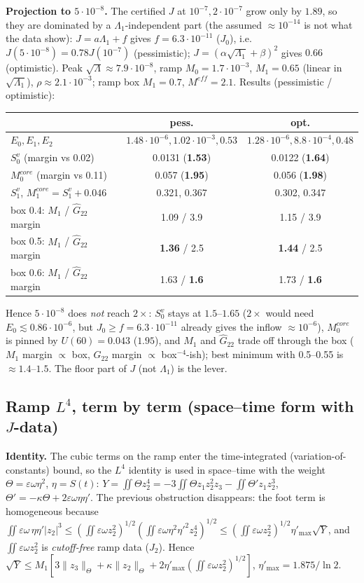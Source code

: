 \documentclass[11pt]{article}
\begin{document}
\textbf{Projection to $5\cdot10^{-8}$.} The certified $J$ at $10^{-7},2\cdot10^{-7}$ grow only by $1.89$, so they are dominated by a $\Lambda_1$-independent part (the assumed $\approx10^{-14}$ is not what the data show): $J=a\Lambda_1+f$ gives $f=6.3\cdot10^{-11}$ ($J_0$), i.e.\ $J(5\cdot10^{-8})=0.78J(10^{-7})$ (pessimistic); $J=(\alpha\sqrt{\Lambda_1}+\beta)^2$ gives $0.66$ (optimistic). Peak $\sqrt\Lambda\approx7.9\cdot10^{-8}$, ramp $M_0=1.7\cdot10^{-3}$, $M_1=0.65$ (linear in $\sqrt{\Lambda_1}$), $\rho\approx2.1\cdot10^{-3}$; ramp box $M_1=0.7$, $M^{eff}=2.1$. Results (pessimistic / optimistic):
\begin{center}\small\begin{tabular}{lcc}
 & pess. & opt.\\\hline
$E_0,E_1,E_2$ & $1.48\cdot10^{-6},1.02\cdot10^{-3},0.53$ & $1.28\cdot10^{-6},8.8\cdot10^{-4},0.48$\\
$S_0^v$ (margin vs 0.02) & 0.0131 (\textbf{1.53}) & 0.0122 (\textbf{1.64})\\
$M_0^{core}$ (margin vs 0.11) & 0.057 (\textbf{1.95}) & 0.056 (\textbf{1.98})\\
$S_1^v$, $M_1^{core}=S_1^v+0.046$ & 0.321, 0.367 & 0.302, 0.347\\
box 0.4: $M_1$ / $\hat G_{22}$ margin & 1.09 / 3.9 & 1.15 / 3.9\\
box 0.5: $M_1$ / $\hat G_{22}$ margin & \textbf{1.36} / 2.5 & \textbf{1.44} / 2.5\\
box 0.6: $M_1$ / $\hat G_{22}$ margin & 1.63 / \textbf{1.6} & 1.73 / \textbf{1.6}
\end{tabular}\end{center}
Hence $5\cdot10^{-8}$ does \emph{not} reach $2\times$: $S_0^v$ stays at $1.5$--$1.65$ ($2\times$ would need $E_0\lesssim0.86\cdot10^{-6}$, but $J_0\ge f=6.3\cdot10^{-11}$ already gives the inflow $\approx10^{-6}$), $M_0^{core}$ is pinned by $U(60)=0.043$ ($1.95$), and $M_1$ and $\hat G_{22}$ trade off through the box ($M_1$ margin $\propto$ box, $\hat G_{22}$ margin $\propto$ box$^{-4}$-ish); best minimum with 0.5--0.55 is $\approx1.4$--$1.5$. The floor part of $J$ (not $\Lambda_1$) is the lever.
\subsection*{Ramp $L^4$, term by term (space--time form with $J$-data)}
\textbf{Identity.} The cubic terms on the ramp enter the time-integrated (variation-of-constants) bound, so the $L^4$ identity is used in space--time with the weight $\Theta=\varepsilon\omega\eta^2$, $\eta=S(t)$: $Y=\iint\Theta z_2^4=-3\iint\Theta z_1z_2^2z_3-\iint\Theta'z_1z_2^3$, $\Theta'=-\kappa\Theta+2\varepsilon\omega\eta\eta'$. The previous obstruction disappears: the foot term is homogeneous because $\iint\varepsilon\omega\,\eta\eta'|z_2|^3\le(\iint\varepsilon\omega z_2^2)^{1/2}(\iint\varepsilon\omega\eta^2\eta'^2z_2^4)^{1/2}\le(\iint\varepsilon\omega z_2^2)^{1/2}\eta'_{\max}\sqrt Y$, and $\iint\varepsilon\omega z_2^2$ is \emph{cutoff-free} ramp data ($J_2$). Hence $\sqrt Y\le M_1[3\|z_3\|_\Theta+\kappa\|z_2\|_\Theta+2\eta'_{\max}(\iint\varepsilon\omega z_2^2)^{1/2}]$, $\eta'_{\max}=1.875/\ln2$.
\end{document}
